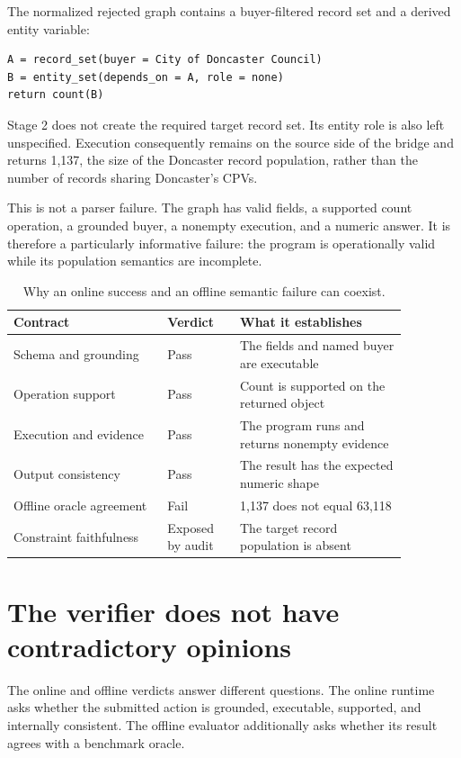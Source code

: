 \documentclass[10pt]{article}
\begin{document}
The normalized rejected graph contains a buyer-filtered record set and a derived entity variable:
\begin{verbatim}
A = record_set(buyer = City of Doncaster Council)
B = entity_set(depends_on = A, role = none)
return count(B)
\end{verbatim}

Stage 2 does not create the required target record set.  Its entity role is also left unspecified.
Execution consequently remains on the source side of the bridge and returns 1,137, the size of the
Doncaster record population, rather than the number of records sharing Doncaster's CPVs.

This is not a parser failure.  The graph has valid fields, a supported count operation, a grounded
buyer, a nonempty execution, and a numeric answer.  It is therefore a particularly informative
failure: the program is operationally valid while its population semantics are incomplete.

\begin{table}[h]
\centering
\small
\begin{tabular}{p{0.34\linewidth}p{0.16\linewidth}p{0.37\linewidth}}
\toprule
Contract & Verdict & What it establishes \\
\midrule
Schema and grounding & Pass & The fields and named buyer are executable \\
Operation support & Pass & Count is supported on the returned object \\
Execution and evidence & Pass & The program runs and returns nonempty evidence \\
Output consistency & Pass & The result has the expected numeric shape \\
Offline oracle agreement & Fail & 1,137 does not equal 63,118 \\
Constraint faithfulness & Exposed by audit & The target record population is absent \\
\bottomrule
\end{tabular}
\caption{Why an online success and an offline semantic failure can coexist.}
\end{table}

\section{The verifier does not have contradictory opinions}

The online and offline verdicts answer different questions.  The online runtime asks whether the
submitted action is grounded, executable, supported, and internally consistent.  The offline
evaluator additionally asks whether its result agrees with a benchmark oracle.
\end{document}
